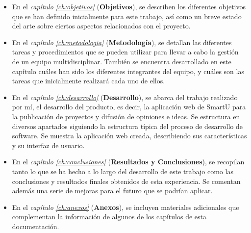 \begin{itemize}
    \item En el \textit{capítulo \ref{ch:objetivos}} (\textbf{Objetivos}), se describen los diferentes objetivos que se han definido inicialmente para este trabajo, así como un breve estado del arte sobre ciertos aspectos relacionados con el proyecto.
    \item En el \textit{capítulo \ref{ch:metodologia}} (\textbf{Metodología}), se detallan las diferentes tareas y procedimientos que se pueden utilizar para llevar a cabo la gestión de un equipo multidisciplinar. También se encuentra desarrollado en este capítulo cuáles han sido los diferentes integrantes del equipo, y cuáles son las tareas que inicialmente realizará cada uno de ellos.
    \item En el \textit{capítulo \ref{ch:desarrollo}} (\textbf{Desarrollo}), se abarca del trabajo realizado por mí, el desarrollo del producto, es decir, la aplicación web de SmartU para la publicación de proyectos y difusión de opiniones e ideas. Se estructura en diversos apartados siguiendo la estructura típica del proceso de desarrollo de software. Se muestra la aplicación web creada, describiendo sus características y su interfaz de usuario.
    \item En el \textit{capítulo \ref{ch:conclusiones}} (\textbf{Resultados y Conclusiones}), se recopilan tanto lo que se ha hecho a lo largo del desarrollo de este trabajo como las conclusiones y resultados finales obtenidos de esta experiencia. Se comentan además una serie de mejoras para el futuro que se podrían aplicar.
    \item En el \textit{capítulo \ref{ch:anexos}} (\textbf{Anexos}), se incluyen materiales adicionales que complementan la información de algunos de los capítulos de esta documentación.
\end{itemize}
